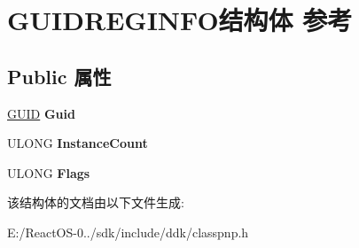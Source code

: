 \hypertarget{struct_g_u_i_d_r_e_g_i_n_f_o}{}\section{G\+U\+I\+D\+R\+E\+G\+I\+N\+F\+O结构体 参考}
\label{struct_g_u_i_d_r_e_g_i_n_f_o}
\subsection*{Public 属性}
\begin{DoxyCompactItemize}
\item 
\mbox{\label{struct_g_u_i_d_r_e_g_i_n_f_o_a97f8a29522d4ccc77537085f1aef7d9e}} 
\hyperlink{interface_g_u_i_d}{G\+U\+ID} {\bfseries Guid}
\item 
\mbox{\label{struct_g_u_i_d_r_e_g_i_n_f_o_acc8a2e1952dacab4a5ffc1507047ff7e}} 
U\+L\+O\+NG {\bfseries Instance\+Count}
\item 
\mbox{\label{struct_g_u_i_d_r_e_g_i_n_f_o_a8e447d2b93091368e13971ca76c003aa}} 
U\+L\+O\+NG {\bfseries Flags}
\end{DoxyCompactItemize}


该结构体的文档由以下文件生成\+:\begin{DoxyCompactItemize}
\item 
E\+:/\+React\+O\+S-\/0../sdk/include/ddk/classpnp.\+h\end{DoxyCompactItemize}
